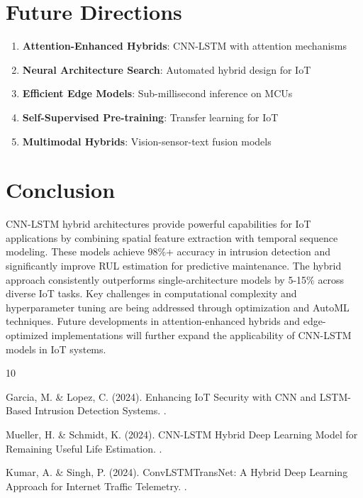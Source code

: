 \documentclass[12pt,a4paper]{article}
\begin{document}
\section{Future Directions}

\begin{enumerate}
    \item \textbf{Attention-Enhanced Hybrids}: CNN-LSTM with attention mechanisms
    \item \textbf{Neural Architecture Search}: Automated hybrid design for IoT
    \item \textbf{Efficient Edge Models}: Sub-millisecond inference on MCUs
    \item \textbf{Self-Supervised Pre-training}: Transfer learning for IoT
    \item \textbf{Multimodal Hybrids}: Vision-sensor-text fusion models
\end{enumerate}

\section{Conclusion}

CNN-LSTM hybrid architectures provide powerful capabilities for IoT applications by combining spatial feature extraction with temporal sequence modeling. These models achieve 98\%+ accuracy in intrusion detection and significantly improve RUL estimation for predictive maintenance. The hybrid approach consistently outperforms single-architecture models by 5-15\% across diverse IoT tasks. Key challenges in computational complexity and hyperparameter tuning are being addressed through optimization and AutoML techniques. Future developments in attention-enhanced hybrids and edge-optimized implementations will further expand the applicability of CNN-LSTM models in IoT systems.


\begin{thebibliography}{10}

Garcia, M. \& Lopez, C. (2024).
\newblock Enhancing IoT Security with CNN and LSTM-Based Intrusion Detection Systems.
.

Mueller, H. \& Schmidt, K. (2024).
\newblock CNN-LSTM Hybrid Deep Learning Model for Remaining Useful Life Estimation.
.

Kumar, A. \& Singh, P. (2024).
\newblock ConvLSTMTransNet: A Hybrid Deep Learning Approach for Internet Traffic Telemetry.
.

\end{thebibliography}
\end{document}
